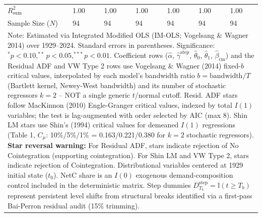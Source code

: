 \begin{table}[H]
\begin{tabular}{p{3.8cm}p{1.35cm}p{1.35cm}p{1.35cm}p{1.35cm}p{1.35cm}p{1.35cm}}
\midrule
$R^2_{\text{sum}}$ & 1.00 & 1.00 & 1.00 & 1.00 & 1.00 & 1.00  \\
Sample Size ($N$) & 94 & 94 & 94 & 94 & 94 & 94  \\
\bottomrule
\multicolumn{7}{p{13.2cm}}{\footnotesize Note: Estimated via Integrated Modified OLS (IM-OLS; Vogelsang \& Wagner 2014) over 1929--2024. Standard errors in parentheses. Significance: $^*p<0.10, ^{**}p<0.05, ^{***}p<0.01$. Coefficient rows ($\hat{\alpha}$, $\hat{\gamma}^{\text{step}}$, $\hat{\theta}_0$, $\hat{\theta}_1$, $\hat{\beta}_{\text{cm}}$) and the Residual ADF and VW Type 2 rows use Vogelsang \& Wagner (2014) fixed-$b$ critical values, interpolated by each model's bandwidth ratio $b=\text{bandwidth}/T$ (Bartlett kernel, Newey-West bandwidth) and its number of stochastic regressors $k=2$ -- NOT a single generic $t$/normal cutoff. Resid. ADF stars follow MacKinnon (2010) Engle-Granger critical values, indexed by total $I(1)$ variables; the test is lag-augmented with order selected by AIC (max 8). Shin LM stars use Shin's (1994) critical values for demeaned $I(1)$ regressions (Table 1, $C_\mu$: 10\%/5\%/1\% = 0.163/0.221/0.380 for $k=2$ stochastic regressors). \textbf{Star reversal warning:} For Residual ADF, stars indicate rejection of No Cointegration (supporting cointegration). For Shin LM and VW Type 2, stars indicate rejection of Cointegration. Distributional variables centered at 1929 initial state ($t_0$). NetC share is an $I(0)$ exogenous demand-composition control included in the deterministic matrix. Step dummies $D^{\text{step}}_{T_b} = \mathbb{I}(t \ge T_b)$ represent persistent level shifts from structural breaks identified via a first-pass Bai-Perron residual audit (15\% trimming).}
\end{tabular}
\end{table}
